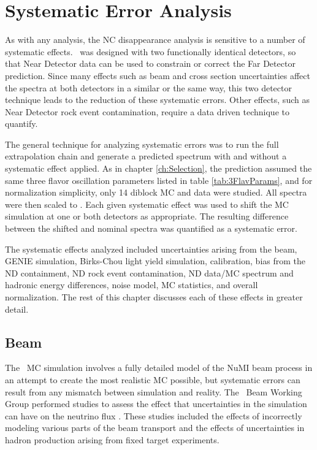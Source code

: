 \chapter{Systematic Error Analysis}
\label{ch:Systs}

As with any analysis, the NC disappearance analysis is sensitive to a number of systematic effects. \nova~was designed with two functionally identical detectors, so that Near Detector data can be used to constrain or correct the Far Detector prediction. Since many effects such as beam and cross section uncertainties affect the spectra at both detectors in a similar or the same way, this two detector technique leads to the reduction of these systematic errors. Other effects, such as Near Detector rock event contamination, require a data driven technique to quantify.

The general technique for analyzing systematic errors was to run the full extrapolation chain and generate a predicted spectrum with and without a systematic effect applied. As in chapter \ref{ch:Selection}, the prediction assumed the same three flavor oscillation parameters listed in table \ref{tab:3FlavParams}, and for normalization simplicity, only 14 diblock MC and data were studied. All spectra were then scaled to . Each given systematic effect was used to shift the MC simulation at one or both detectors as appropriate. The resulting difference between the shifted and nominal spectra was quantified as a systematic error.

The systematic effects analyzed included uncertainties arising from the beam, GENIE simulation, Birks-Chou light yield simulation, calibration, bias from the ND containment, ND rock event contamination, ND data/MC spectrum and hadronic energy differences, noise model, MC statistics, and overall normalization. The rest of this chapter discusses each of these effects in greater detail.

\section{Beam}

The \nova~MC simulation involves a fully detailed model of the NuMI beam process in an attempt to create the most realistic MC possible, but systematic errors can result from any mismatch between simulation and reality. The \nova~Beam Working Group performed studies to assess the effect that uncertainties in the simulation can have on the neutrino flux \cite{ref:TNBeam}. These studies included the effects of incorrectly modeling various parts of the beam transport and the effects of uncertainties in hadron production arising from fixed target experiments.

